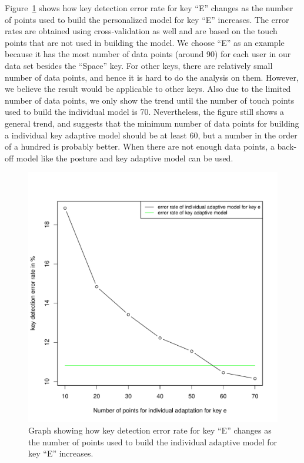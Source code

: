 \documentclass{sigchi}
\begin{document}
Figure~\ref{fig:user-adapt} shows how key detection error rate for key ``E'' 
changes as the number of points used to build
the personalized model for key ``E'' increases. The error rates are obtained using cross-validation
as well and are based on the touch points that are not used in building the
model. We choose ``E'' as an
example because it has the most number of data points (around 90) for each
user in our data set besides the ``Space'' key. For other keys, there are
relatively small number of data points, and hence it is hard to do the
analysis on them. However, we believe the result would be applicable to other
keys. Also due to the limited number
of data points, we only show the trend until the number of touch points used to build the individual
model is 70. Nevertheless, the figure still shows a general trend, and suggests 
that the minimum number of data points for building a individual key adaptive model
should be at least 60, but a number in the order of a hundred is probably better. When
there are not enough data points, a back-off model like the posture and key adaptive model can be used.

\begin{figure}[tb]
  \centering
  \includegraphics[width=0.9\columnwidth]{figures/individual-adapt.pdf}
  \caption{Graph showing how key detection error rate for key ``E'' changes as the number of
  points used to build the individual adaptive model for key ``E'' increases.}
  \label{fig:user-adapt}
\end{figure}
\end{document}
